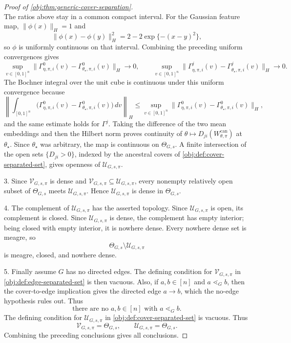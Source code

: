 \begin{proof}[Proof of \cref{obj:thm:generic-cover-separation}]
\[\]
The ratios above stay in a common compact interval.  For the Gaussian feature
map, \(\|\phi(x)\|_H=1\) and
\[
\|\phi(x)-\phi(y)\|_H^2
=2-2\exp\{-(x-y)^2\},
\]
so \(\phi\) is uniformly continuous on that interval.  Combining the preceding
uniform convergences gives
\[
\sup_{v\in[0,1]^n}
\|\Gamma^0_{\eta,\pi,i}(v)-\Gamma^0_{\theta_\star,\pi,i}(v)\|_H
\longrightarrow0,
\qquad
\sup_{v\in[0,1]^n}
\|\Gamma^j_{\eta,\pi,i}(v)-\Gamma^j_{\theta_\star,\pi,i}(v)\|_H
\longrightarrow0.
\]
The Bochner integral over the unit cube is continuous under this uniform
convergence because
\[
\left\|
\int_{[0,1]^n}
\bigl(\Gamma^0_{\eta,\pi,i}(v)-\Gamma^0_{\theta_\star,\pi,i}(v)\bigr)\,dv
\right\|_H
\le
\sup_{v\in[0,1]^n}
\|\Gamma^0_{\eta,\pi,i}(v)-\Gamma^0_{\theta_\star,\pi,i}(v)\|_H,
\]
and the same estimate holds for \(\Gamma^j\).  Taking the difference of the two
mean embeddings and then the Hilbert norm proves continuity of
\(\theta\mapsto D_{ji}(W_{\theta,\pi}^{\mathrm{can}})\) at
\(\theta_\star\).  Since \(\theta_\star\) was arbitrary, the map is continuous
on \(\Theta_{G,s}\).  A finite intersection of the open sets \(\{D_{ji}>0\}\),
indexed by the ancestral covers of \cref{obj:def:cover-separated-set}, gives
openness of \(\mathcal U_{G,s,\pi}\). %

3.  Since \(\mathcal V_{G,s,\pi}\) is dense and
\(\mathcal V_{G,s,\pi}\subseteq\mathcal U_{G,s,\pi}\), every nonempty relatively
open subset of \(\Theta_{G,s}\) meets \(\mathcal U_{G,s,\pi}\).  Hence
\(\mathcal U_{G,s,\pi}\) is dense in \(\Theta_{G,s}\). %

4.  The complement of \(\mathcal U_{G,s,\pi}\) has the asserted topology.  Since
\(\mathcal U_{G,s,\pi}\) is open, its complement is closed.  Since
\(\mathcal U_{G,s,\pi}\) is dense, the complement has empty interior; being
closed with empty interior, it is nowhere dense.  Every nowhere dense set is
meagre, so
\[
\Theta_{G,s}\setminus\mathcal U_{G,s,\pi}
\]
is meagre, closed, and nowhere dense. %

5.  Finally assume \(G\) has no directed edges.  The defining condition for
\(\mathcal V_{G,s,\pi}\) in \cref{obj:def:edge-separated-set} is then
vacuous.  Also, if \(a,b\in[n]\) and \(a\lessdot_G b\), then the cover-to-edge implication
gives the directed edge \(a\to b\), which the no-edge hypothesis rules out.  Thus
\[
\text{there are no }a,b\in[n]\text{ with }a\lessdot_G b.
\]
The defining condition for
\(\mathcal U_{G,s,\pi}\) in \cref{obj:def:cover-separated-set} is vacuous.
Thus
\[
\mathcal V_{G,s,\pi}=\Theta_{G,s},
\qquad
\mathcal U_{G,s,\pi}=\Theta_{G,s}.
\]
Combining the preceding conclusions gives all conclusions. %
\end{proof}

